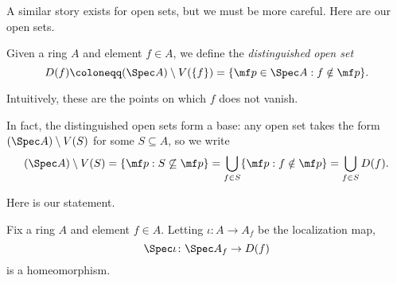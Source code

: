 \documentclass[../notes.tex]{subfiles}
\begin{document}
A similar story exists for open sets, but we must be more careful. Here are our open sets.
\begin{definition}
	Given a ring $A$ and element $f\in A$, we define the \textit{distinguished open set}
	\[D(f)\coloneqq(\Spec A)\setminus V(\{f\})=\{\mf p\in\Spec A:f\notin\mf p\}.\]
\end{definition}
Intuitively, these are the points on which $f$ does not vanish.
\begin{remark} \label{rem:distinguishedbase}
	In fact, the distinguished open sets form a base: any open set takes the form $(\Spec A)\setminus V(S)$ for some $S\subseteq A$, so we write
	\[(\Spec A)\setminus V(S)=\{\mf p:S\not\subseteq\mf p\}=\bigcup_{f\in S}\{\mf p:f\notin\mf p\}=\bigcup_{f\in S}D(f).\]
\end{remark}
Here is our statement.
\begin{exe} \label{exe:distinguishedisaffine}
	Fix a ring $A$ and element $f\in A$. Letting $\iota\colon A\to A_f$ be the localization map,
	\[\Spec\iota\colon\Spec A_f\to D(f)\]
	is a homeomorphism.
\end{exe}
\end{document}
